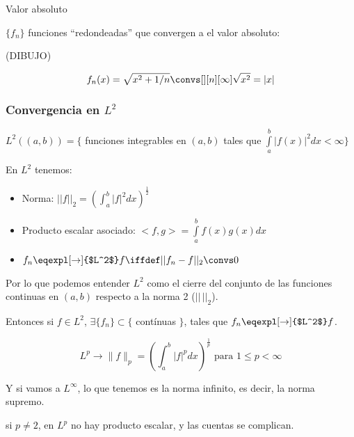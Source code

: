 		\begin{example}{Valor absoluto}

			$\{f_n\}$ funciones ``redondeadas'' que convergen a el valor absoluto:

			(DIBUJO)

			\[f_n(x) = \sqrt{x^2 + 1/n} \convs[][n][\infty] \sqrt{x^2} = |x| \]

		\end{example}

	\subsubsection{Convergencia en $L^2$}

		\begin{defn}[Convergencia\IS en $L^2$]

			$L^2((a,b)) = \{$ funciones integrables en $(a,b)$ tales que $\int\limits_{a}^{b} |f(x)|^2 dx < \infty \}$

			En $L^2$ tenemos:
			\begin{itemize}
				\item Norma: $||f||_2 = \left( \int^{b}_{a} |f|^2 dx \right)^{\frac{1}{2}}$

				\item Producto escalar asociado: $<f,g> = \int\limits^b_a f(x) g(x) dx $

				\item $f_n \eqexpl[\rightarrow]{$L^2$} f \iffdef ||f_n - f||_2 \convs 0 $
			\end{itemize}

			Por lo que podemos entender $L^2$ como el cierre del conjunto de las funciones continuas en $(a,b)$ respecto a la norma 2 ($||\,||_2$).

			Entonces si $f \in L^2$, $\exists \{f_n\} \subset \{$ contínuas $\}$, tales que $f_n \eqexpl[\rightarrow]{$L^2$}f$.
		\end{defn}

		\begin{defn}[Convergencia\IS en $L^p$]

			\[L^p \rightarrow \|f\|_{p} = \left( \int^{b}_a |f|^p dx \right)^{\frac{1}{p}} \text{ para } 1 \leq p < \infty \]

		\end{defn}

			Y si vamos a $L^\infty$, lo que tenemos es la norma infinito, es decir, la norma supremo.

			\obs si $p\neq 2$, en $L^p$ no hay producto escalar, y las cuentas se complican.

